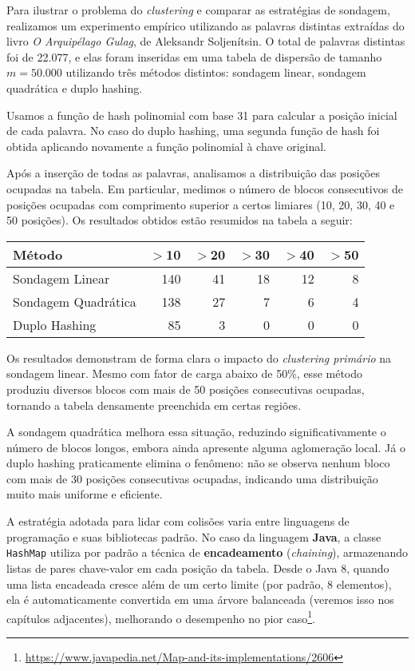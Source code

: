 Para ilustrar o problema do \textit{clustering} e comparar as estratégias de sondagem, realizamos um experimento empírico utilizando as palavras distintas extraídas do livro \textit{O Arquipélago Gulag}, de Aleksandr Soljenítsin. 
O total de palavras distintas foi de 22.077, e elas foram inseridas em uma tabela de dispersão de tamanho $m = 50.000$ utilizando três métodos distintos: sondagem linear, sondagem quadrática e duplo hashing.

Usamos a função de hash polinomial com base 31 para calcular a posição inicial de cada palavra. 
No caso do duplo hashing, uma segunda função de hash foi obtida aplicando novamente a função polinomial à chave original.

Após a inserção de todas as palavras, analisamos a distribuição das posições ocupadas na tabela. 
Em particular, medimos o número de blocos consecutivos de posições ocupadas com comprimento superior a certos limiares (10, 20, 30, 40 e 50 posições). 
Os resultados obtidos estão resumidos na tabela a seguir:

\begin{center}
\begin{tabular}{lrrrrr}
\hline
\textbf{Método} & \textbf{$>$10} & \textbf{$>$20} & \textbf{$>$30} & \textbf{$>$40} & \textbf{$>$50} \\
\hline
Sondagem Linear      & 140 & 41 & 18 & 12 & 8 \\
Sondagem Quadrática  & 138 & 27 & 7  & 6  & 4 \\
Duplo Hashing        &  85 &  3 & 0  & 0  & 0 \\
\hline
\end{tabular}
\end{center}

Os resultados demonstram de forma clara o impacto do \textit{clustering primário} na sondagem linear. 
Mesmo com fator de carga abaixo de 50\%, esse método produziu diversos blocos com mais de 50 posições consecutivas ocupadas, tornando a tabela densamente preenchida em certas regiões.

A sondagem quadrática melhora essa situação, reduzindo significativamente o número de blocos longos, embora ainda apresente alguma aglomeração local. 
Já o duplo hashing praticamente elimina o fenômeno: não se observa nenhum bloco com mais de 30 posições consecutivas ocupadas, indicando uma distribuição muito mais uniforme e eficiente.

A estratégia adotada para lidar com colisões varia entre linguagens de programação e suas bibliotecas padrão. 
No caso da linguagem \textbf{Java}, a classe \texttt{HashMap} utiliza por padrão a técnica de \textbf{encadeamento} (\textit{chaining}), armazenando listas de pares chave-valor em cada posição da tabela. 
Desde o Java 8, quando uma lista encadeada cresce além de um certo limite (por padrão, 8 elementos), ela é automaticamente convertida em uma árvore balanceada (veremos isso nos capítulos adjacentes), melhorando o desempenho no pior caso\footnote{\url{https://www.javapedia.net/Map-and-its-implementations/2606}}. 

